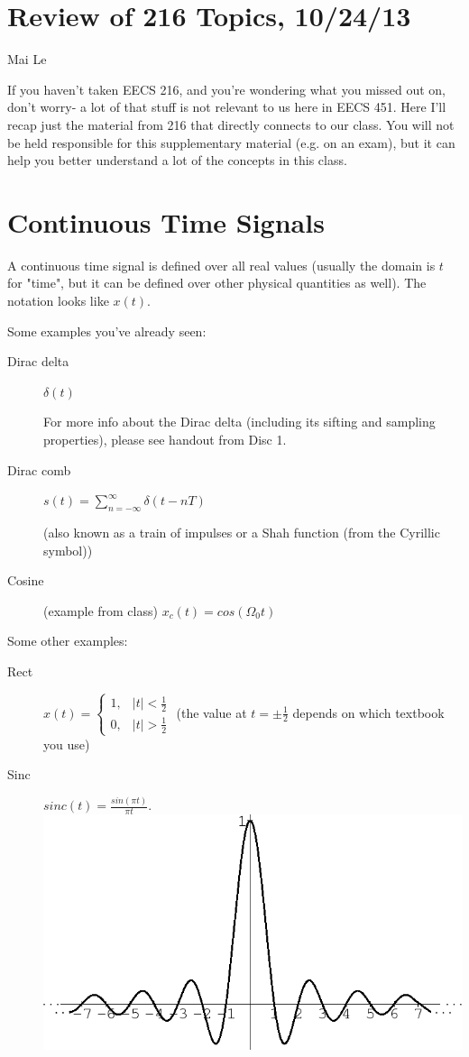 \documentclass[11pt]{article}
\begin{document}
\section*{Review of 216 Topics, 10/24/13}
Mai Le

If you haven't taken EECS 216, and you're wondering what you missed out on, don't worry- a lot of that stuff is not relevant to us here in EECS 451. Here I'll recap just the material from 216 that directly connects to our class. You will not be held responsible for this supplementary material (e.g. on an exam), but it can help you better understand a lot of the concepts in this class. 

\section{Continuous Time Signals}

A continuous time signal is defined over all real values (usually the domain is $t$ for "time", but it can be defined over other physical quantities as well). The notation looks like $x(t)$.

Some examples you've already seen:

\begin{description}
	\item[Dirac delta] $\delta(t)$ 
	
	\qquad For more info about the Dirac delta (including its sifting and sampling properties), please see handout from Disc 1.
	\item[Dirac comb]  $s(t) = \sum\limits_{n=-\infty}^\infty \delta(t-nT)$
	
	\qquad (also known as a train of impulses or a Shah function (from the Cyrillic symbol))
	\item[Cosine] (example from class) $x_c(t) = cos(\Omega_0 t)$
\end{description}

Some other examples:

\begin{description}
	\item[Rect] $x(t) = \begin{cases} 1, & |t| <\frac{1}{2} \\
	0, & |t| > \frac{1}{2}
	\end{cases}$  (the value at $t=\pm \frac{1}{2}$ depends on which textbook you use)
	\item[Sinc] $sinc(t) = \frac{sin(\pi t)}{\pi t}$. \includegraphics[scale=0.3]{sinc.png} 
\end{description}
\end{document}

